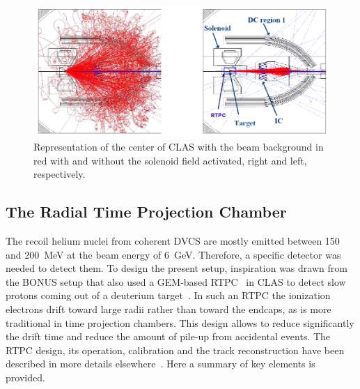 \documentclass[aps,prc,preprint,superscriptaddress]{revtex4}
\begin{document}
\begin{figure}[tbp!]
\center
\includegraphics[width=14cm]{solenoid.png}
\caption{Representation of the center of CLAS with the beam background in red with and without
	the solenoid field activated, right and left, respectively.}
\label{fig:Solenoid}
\end{figure}


\subsection{The Radial Time Projection Chamber}

The recoil helium nuclei from coherent DVCS are mostly emitted between 150 
and 200~MeV at the beam energy of 6~GeV. Therefore, a specific detector was 
needed to detect them. To design the present setup, inspiration was drawn from the 
BONUS setup that also used a GEM-based RTPC~\cite{Fenker:2008zz} in CLAS to 
detect slow protons coming out of a deuterium target~\cite{Baillie:2011za}. In such an RTPC the 
ionization electrons drift toward large radii 
rather than toward the endcaps, as is more traditional in time 
projection chambers. This design allows to reduce significantly the drift time and reduce the 
amount of pile-up from accidental events. The RTPC design, its operation, calibration and 
the track reconstruction have been described in more 
details elsewhere~\cite{Dupre:2017upj}. Here a summary of key elements is provided.
\end{document}
